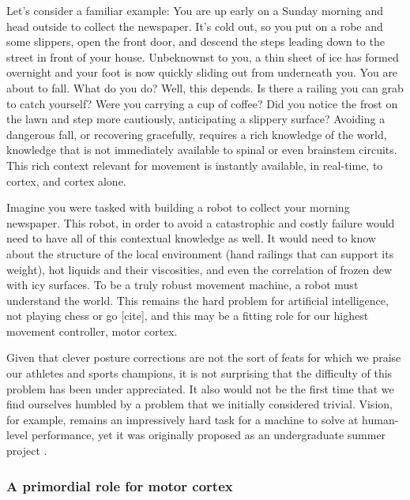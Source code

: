 Let’s consider a familiar example: You are up early on a Sunday morning and head outside to collect the newspaper. It’s cold out, so you put on a robe and some slippers, open the front door, and descend the steps leading down to the street in front of your house. Unbeknownst to you, a thin sheet of ice has formed overnight and your foot is now quickly sliding out from underneath you. You are about to fall. What do you do? Well, this depends. Is there a railing you can grab to catch yourself? Were you carrying a cup of coffee? Did you notice the frost on the lawn and step more cautiously, anticipating a slippery surface? Avoiding a dangerous fall, or recovering gracefully, requires a rich knowledge of the world, knowledge that is not immediately available to spinal or even brainstem circuits. This rich context relevant for movement is instantly available, in real-time, to cortex, and cortex alone.

Imagine you were tasked with building a robot to collect your morning newspaper. This robot, in order to avoid a catastrophic and costly failure would need to have all of this contextual knowledge as well. It would need to know about the structure of the local environment (hand railings that can support its weight), hot liquids and their viscosities, and even the correlation of frozen dew with icy surfaces. To be a truly robust movement machine, a robot must understand the world. This remains the hard problem for artificial intelligence, not playing chess or go [cite], and this may be a fitting role for our highest movement controller, motor cortex.

Given that clever posture corrections are not the sort of feats for which we praise our athletes and sports champions, it is not surprising that the difficulty of this problem has been under appreciated. It also would not be the first time that we find ourselves humbled by a problem that we initially considered trivial. Vision, for example, remains an impressively hard task for a machine to solve at human-level performance, yet it was originally proposed as an undergraduate summer project \cite{Papert1966}.

\subsubsection*{A primordial role for motor cortex}

